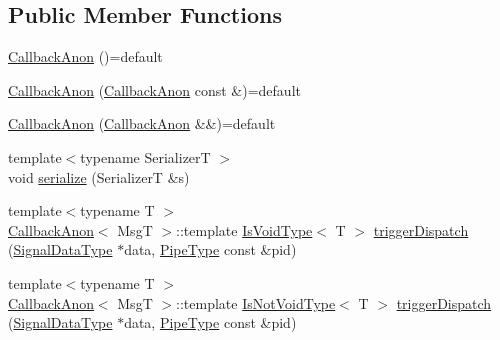 \subsection*{Public Member Functions}
\begin{DoxyCompactItemize}
\item 
\hyperlink{structvt_1_1pipe_1_1callback_1_1_callback_anon_aaca363b861f00c073c7b73dbef6e01fd}{Callback\+Anon} ()=default
\item 
\hyperlink{structvt_1_1pipe_1_1callback_1_1_callback_anon_a1979ced8fbd839d64f67eafb8fccdcff}{Callback\+Anon} (\hyperlink{structvt_1_1pipe_1_1callback_1_1_callback_anon}{Callback\+Anon} const \&)=default
\item 
\hyperlink{structvt_1_1pipe_1_1callback_1_1_callback_anon_ad9b8f6ae2a97e9e6b0e6cdbdbab34952}{Callback\+Anon} (\hyperlink{structvt_1_1pipe_1_1callback_1_1_callback_anon}{Callback\+Anon} \&\&)=default
\item 
{\footnotesize template$<$typename SerializerT $>$ }\\void \hyperlink{structvt_1_1pipe_1_1callback_1_1_callback_anon_a3a20757f336876eaed296bd11897bf97}{serialize} (SerializerT \&s)
\item 
{\footnotesize template$<$typename T $>$ }\\\hyperlink{structvt_1_1pipe_1_1callback_1_1_callback_anon}{Callback\+Anon}$<$ MsgT $>$\+::template \hyperlink{structvt_1_1pipe_1_1callback_1_1_callback_anon_a3aa19d4a1044d57ba4af22015331c20a}{Is\+Void\+Type}$<$ T $>$ \hyperlink{structvt_1_1pipe_1_1callback_1_1_callback_anon_a5e4d44e498c5a31a452fa75aa3714fac}{trigger\+Dispatch} (\hyperlink{structvt_1_1pipe_1_1callback_1_1_callback_anon_ac503b95feb44bb0b60c1d69e1ed29074}{Signal\+Data\+Type} $\ast$data, \hyperlink{namespacevt_ac9852acda74d1896f48f406cd72c7bd3}{Pipe\+Type} const \&pid)
\item 
{\footnotesize template$<$typename T $>$ }\\\hyperlink{structvt_1_1pipe_1_1callback_1_1_callback_anon}{Callback\+Anon}$<$ MsgT $>$\+::template \hyperlink{structvt_1_1pipe_1_1callback_1_1_callback_anon_a91e58fe2f8165c826cecedde7e4535cf}{Is\+Not\+Void\+Type}$<$ T $>$ \hyperlink{structvt_1_1pipe_1_1callback_1_1_callback_anon_a2d66de99b38b4c89f880c408346247de}{trigger\+Dispatch} (\hyperlink{structvt_1_1pipe_1_1callback_1_1_callback_anon_ac503b95feb44bb0b60c1d69e1ed29074}{Signal\+Data\+Type} $\ast$data, \hyperlink{namespacevt_ac9852acda74d1896f48f406cd72c7bd3}{Pipe\+Type} const \&pid)
\end{DoxyCompactItemize}
